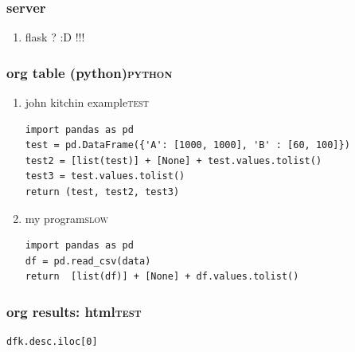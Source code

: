 \documentclass[11pt]{article}
\begin{document}
\subsubsection{server}
\label{sec:org51e2143}
\begin{enumerate}
\item flask ? :D !!!
\label{sec:org89f7380}
\end{enumerate}
\subsubsection{org  table (python)\hfill{}\textsc{python}}
\label{sec:org737abd2}
\begin{enumerate}
\item john kitchin example\hfill{}\textsc{test}
\label{sec:orge10e081}
\begin{verbatim}
import pandas as pd
test = pd.DataFrame({'A': [1000, 1000], 'B' : [60, 100]})
test2 = [list(test)] + [None] + test.values.tolist()
test3 = test.values.tolist()
return (test, test2, test3)
\end{verbatim}

\item my program\hfill{}\textsc{slow}
\label{sec:org4a47c3c}
\begin{verbatim}
import pandas as pd
df = pd.read_csv(data)
return  [list(df)] + [None] + df.values.tolist()
\end{verbatim}
\end{enumerate}

\subsubsection{org results: html\hfill{}\textsc{test}}
\label{sec:org7b04b1d}
\begin{verbatim}
dfk.desc.iloc[0]
\end{verbatim}
\end{document}
